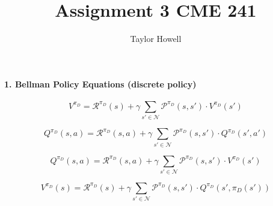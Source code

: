 \documentclass[12pt]{article}
\title{Assignment 3 CME 241}
\author{Taylor Howell}
\begin{document}
\maketitle

\paragraph{1. Bellman Policy Equations (discrete policy)}
$$V^{\pi_D} = \mathcal{R}^{\pi_D}(s) + \gamma \sum\limits_{s' \in \mathcal{N}} \mathcal{P}^{\pi_D}(s, s') \cdot V^{\pi_D}(s')$$

$$Q^{\pi_D}(s,a) = \mathcal{R}^{\pi_D}(s, a) + \gamma \sum\limits_{s' \in \mathcal{N}} \mathcal{P}^{\pi_D}(s, s') \cdot Q^{\pi_D}(s', a')$$

$$Q^{\pi_D}(s,a) = \mathcal{R}^{\pi_D}(s, a) + \gamma \sum\limits_{s' \in \mathcal{N}} \mathcal{P}^{\pi_D}(s, s') \cdot V^{\pi_D}(s')$$

$$V^{\pi_D}(s) = \mathcal{R}^{\pi_D}(s) + \gamma \sum\limits_{s' \in \mathcal{N}} \mathcal{P}^{\pi_D}(s, s') \cdot Q^{\pi_D}(s',\pi_D(s'))$$

\end{document}
